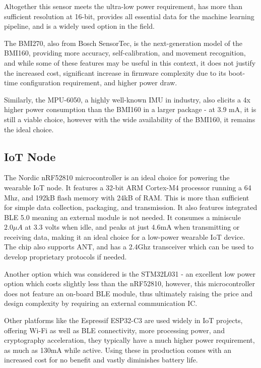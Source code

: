 \documentclass[conference]{IEEEtran}
\begin{document}
Altogether this sensor meets the ultra-low power requirement, has more than sufficient resolution at 16-bit, provides all essential data for the machine learning pipeline, and is a widely used option in the field.

The BMI270, also from Bosch SensorTec, is the next-generation model of the BMI160, providing more accuracy, self-calibration, and movement recognition, and while some of these features may be useful in this context, it does not justify the increased cost, significant increase in firmware complexity due to its boot-time configuration requirement, and higher power draw.

Similarly, the MPU-6050, a highly well-known IMU in industry, also elicits a 4x higher power consumption than the BMI160 in a larger package - at 3.9 mA, it is still a viable choice, however with the wide availability of the BMI160, it remains the ideal choice.

\subsection{IoT Node}
The Nordic nRF52810 microcontroller\cite{nRF52810} is an ideal choice for powering the wearable IoT node. It features a 32-bit ARM Cortex-M4 processor running a 64 Mhz, and 192kB flash memory with 24kB of RAM. This is more than sufficient for simple data collection, packaging, and transmission. It also features integrated BLE 5.0 meaning an external module is not needed. It consumes a miniscule $2.0\mu A$ at 3.3 volts when idle, and peaks at just 4.6mA when transmitting or receiving data, making it an ideal choice for a low-power wearable IoT device. The chip also supports ANT, and has a 2.4Ghz transceiver which can be used to develop proprietary protocols if needed.

Another option which was considered is the STM32L031 - an excellent low power option which costs slightly less than the nRF52810, however, this microcontroller does not feature an on-board BLE module, thus ultimately raising the price and design complexity by requiring an external communication IC. 

Other platforms like the Espressif ESP32-C3 are used widely in IoT projects, offering Wi-Fi as well as BLE connectivity, more processing power, and cryptography acceleration\cite{b8}, they typically have a much higher power requirement, as much as 130mA while active. Using these in production comes with an increased cost for no benefit and vastly diminishes battery life.
\end{document}
